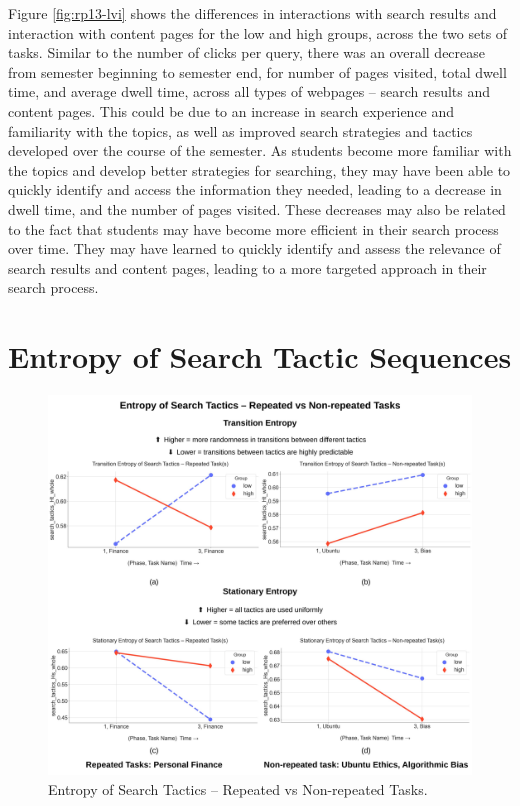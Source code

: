 \documentclass[letterpaper, nobind]{templates/ociamthesis}
\begin{document}
Figure \ref{fig:rp13-lvi} shows the differences in interactions with search results and interaction with content pages for the low and high groups, across the two sets of tasks.
Similar to the number of clicks per query, there was an overall decrease from semester beginning to semester end, for number of pages visited, total dwell time, and average dwell time, across all types of webpages -- search results and content pages.
This could be due to an increase in search experience and familiarity with the topics, as well as improved search strategies and tactics developed over the course of the semester. As students become more familiar with the topics and develop better strategies for searching, they may have been able to quickly identify and access the information they needed, leading to a decrease in dwell time, and the number of pages visited.
These decreases may also be related to the fact that students may have become more efficient in their search process over time. They may have learned to quickly identify and assess the relevance of search results and content pages, leading to a more targeted approach in their search process.

\hypertarget{entropy-of-search-tactic-sequences-1}{%
\section{Entropy of Search Tactic Sequences}\label{entropy-of-search-tactic-sequences-1}}

\begin{figure}

{\centering \includegraphics[width=1\linewidth]{figs/rp13-tactic-entropy} 

}

\caption[Entropy of Search Tactics -- Repeated vs Non-repeated Tasks.]{Entropy of Search Tactics -- Repeated vs Non-repeated Tasks.}\label{fig:rp13-tactic-entropy}
\end{figure}
\end{document}
